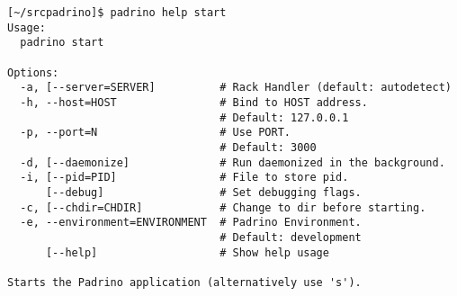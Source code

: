 \begin{verbatim}
[~/srcpadrino]$ padrino help start
Usage:
  padrino start

Options:
  -a, [--server=SERVER]          # Rack Handler (default: autodetect)
  -h, --host=HOST                # Bind to HOST address.
                                 # Default: 127.0.0.1
  -p, --port=N                   # Use PORT.
                                 # Default: 3000
  -d, [--daemonize]              # Run daemonized in the background.
  -i, [--pid=PID]                # File to store pid.
      [--debug]                  # Set debugging flags.
  -c, [--chdir=CHDIR]            # Change to dir before starting.
  -e, --environment=ENVIRONMENT  # Padrino Environment.
                                 # Default: development
      [--help]                   # Show help usage

Starts the Padrino application (alternatively use 's').

\end{verbatim}
